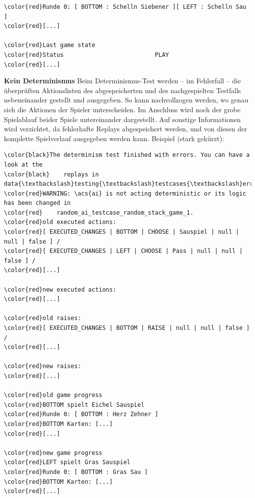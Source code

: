 \documentclass[
							a4paper, 
							11pt, 
							openany, 
							liststotoc,
							parskip=half, 
   							headings=normal
						]{scrreprt}
\begin{document}
{\begin{Verbatim}[commandchars=\\\{\}]
\color{red}Runde 0: [ BOTTOM : Schelln Siebener ][ LEFT : Schelln Sau ]
\color{red}[...]

\color{red}Last game state
\color{red}Status                          PLAY                            
\color{red}[...]                             
\end{Verbatim}
\normalsize
\bigskip

\textbf{Kein Determinismus}\newline
Beim Determinismus-Test werden -- im Fehlerfall -- die überprüften Aktionslisten des abgespeicherten und des nachgespielten Testfalls nebeneinander gestellt und ausgegeben. So kann nachvollzogen werden, wo genau sich die Aktionen der Spieler unterscheiden. Im Anschluss wird noch der grobe Spielablauf beider Spiele untereinander dargestellt.\newline
Auf sonstige Informationen wird verzichtet, da fehlerhafte Replays abgespeichert werden, und von diesen der komplette Spielverlauf ausgegeben werden kann.\newline
Beispiel (stark gekürzt):
\small
\begin{Verbatim}[commandchars=\\\{\}]
\color{black}The determinism test finished with errors. You can have a look at the 
\color{black}    replays in data{\textbackslash}testing{\textbackslash}testcases{\textbackslash}error_replay.
\color{red}WARNING: \acs{ai} is not acting deterministic or its logic has been changed in
\color{red}    random_ai_testcase_random_stack_game_1.
\color{red}old executed actions: 
\color{red}[ EXECUTED_CHANGES | BOTTOM | CHOOSE | Sauspiel | null | null | false ] / 
\color{red}[ EXECUTED_CHANGES | LEFT | CHOOSE | Pass | null | null | false ] / 
\color{red}[...]

\color{red}new executed actions: 
\color{red}[...]

\color{red}old raises: 
\color{red}[ EXECUTED_CHANGES | BOTTOM | RAISE | null | null | false ] / 
\color{red}[...]

\color{red}new raises: 
\color{red}[...]

\color{red}old game progress
\color{red}BOTTOM spielt Eichel Sauspiel
\color{red}Runde 0: [ BOTTOM : Herz Zehner ]
\color{red}BOTTOM Karten: [...]
\color{red}[...]

\color{red}new game progress
\color{red}LEFT spielt Gras Sauspiel
\color{red}Runde 0: [ BOTTOM : Gras Sau ]
\color{red}BOTTOM Karten: [...]
\color{red}[...]
\end{Verbatim}
\normalsize

}
\end{document}
